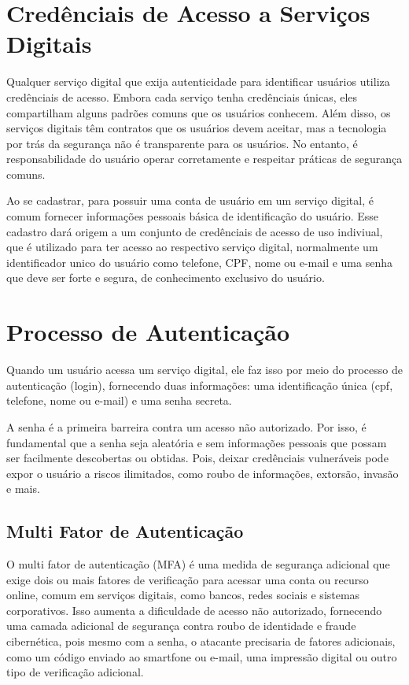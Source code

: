 \documentclass[12pt]{article}
\begin{document}
\section{Credênciais de Acesso a Serviços Digitais} \label{sec:firstpage}

Qualquer serviço digital que exija autenticidade para identificar usuários
utiliza credênciais de acesso.
Embora cada serviço tenha credênciais únicas, eles compartilham alguns
padrões comuns que os usuários conhecem.
Além disso, os serviços digitais têm contratos que os usuários devem aceitar,
mas a tecnologia por trás da segurança não é transparente para os usuários.
No entanto, é responsabilidade do usuário operar corretamente e respeitar
práticas de segurança comuns.

Ao se cadastrar, para possuir uma conta de usuário em um serviço digital,
é comum fornecer informações pessoais básica de identificação do usuário.
Esse cadastro dará origem a um conjunto de credênciais de acesso de uso
indiviual, que é utilizado para ter acesso ao respectivo serviço digital,
normalmente um identificador unico do usuário como telefone, CPF, nome ou
e-mail e uma senha que deve ser forte e segura, de conhecimento exclusivo
do usuário.

\section{Processo de Autenticação}

Quando um usuário acessa um serviço digital, ele faz isso por meio do
processo de autenticação (login), fornecendo duas informações: uma
identificação única (cpf, telefone, nome ou e-mail) e uma senha secreta.

A senha é a primeira barreira contra um acesso não autorizado.
Por isso, é fundamental que a senha seja aleatória e sem informações
pessoais que possam ser facilmente descobertas ou obtidas.
Pois, deixar credênciais vulneráveis pode expor o usuário a riscos ilimitados,
como roubo de informações, extorsão, invasão e mais.

\subsection{Multi Fator de Autenticação}

O multi fator de autenticação (MFA) é uma medida de segurança adicional que
exige dois ou mais fatores de verificação para acessar uma conta ou
recurso online, comum em serviços digitais, como bancos, redes sociais e
sistemas corporativos.
Isso aumenta a dificuldade de acesso não autorizado, fornecendo uma camada
adicional de segurança contra roubo de identidade e fraude cibernética, pois
mesmo com a senha, o atacante precisaria de fatores adicionais, como um código
enviado ao smartfone ou e-mail, uma impressão digital ou outro tipo de
verificação adicional.
\end{document}
